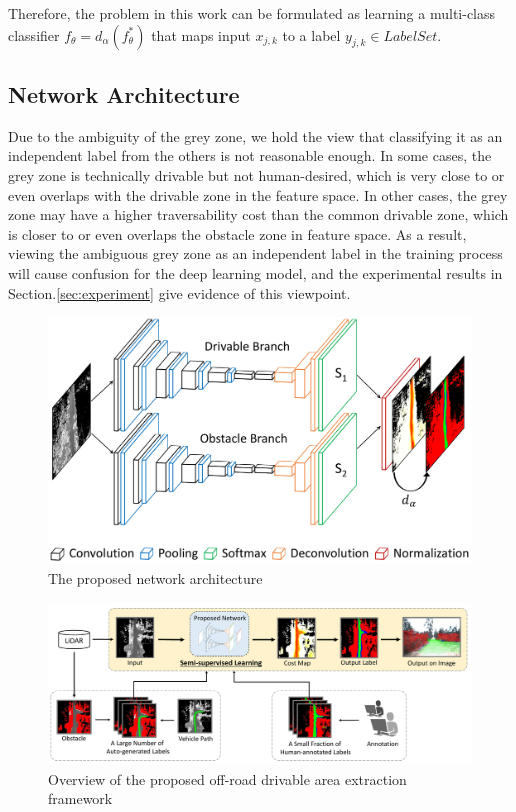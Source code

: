 \documentclass[letterpaper, 10 pt, conference]{ieeeconf}  %
\begin{document}
Therefore, the problem in this work can be formulated as learning a multi-class classifier $f_\theta=d_\alpha(f_\theta^*)$ that maps input $x_{j,k}$ to a label $y_{j,k}\in LabelSet$.

\subsection{Network Architecture}
Due to the ambiguity of the grey zone, we hold the view that classifying it as an independent label from the others is not reasonable enough. In some cases, the grey zone is technically drivable but not human-desired, which is very close to or even overlaps with the drivable zone in the feature space. In other cases, the grey zone may have a higher traversability cost than the common drivable zone, which is closer to or even overlaps the obstacle zone in feature space. As a result, viewing the ambiguous grey zone as an independent label in the training process will cause confusion for the deep learning model, and the experimental results in Section.\ref{sec:experiment} give evidence of this viewpoint.

\begin{figure}[b]
	\vspace{-2mm}
	\centering
	\includegraphics[scale=0.22]{network.pdf}
	\caption{The proposed network architecture}
	\label{fig:network}
\end{figure}

\begin{figure}[ht]
	\centering
	\includegraphics[scale=0.4]{framework.pdf}
	\caption{Overview of the proposed off-road drivable area extraction framework}
	\label{fig:framework}
	\vspace{-4mm}
\end{figure}
\end{document}
